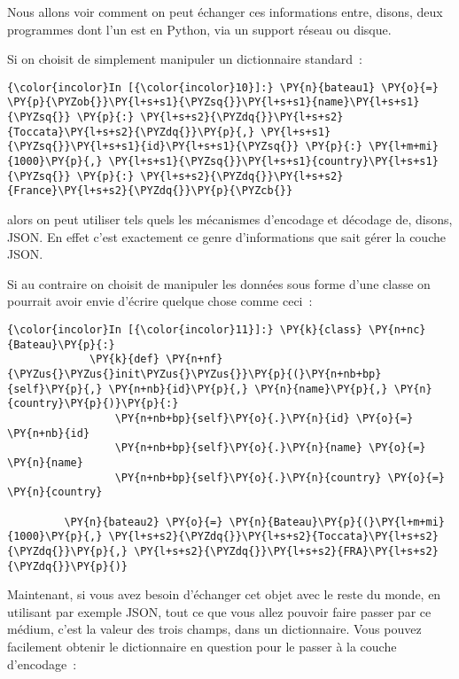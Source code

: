 Nous allons voir comment on peut échanger ces informations entre,
disons, deux programmes dont l'un est en Python, via un support réseau
ou disque.

    Si on choisit de simplement manipuler un dictionnaire standard~:

    \begin{Verbatim}[commandchars=\\\{\}]
{\color{incolor}In [{\color{incolor}10}]:} \PY{n}{bateau1} \PY{o}{=} \PY{p}{\PYZob{}}\PY{l+s+s1}{\PYZsq{}}\PY{l+s+s1}{name}\PY{l+s+s1}{\PYZsq{}} \PY{p}{:} \PY{l+s+s2}{\PYZdq{}}\PY{l+s+s2}{Toccata}\PY{l+s+s2}{\PYZdq{}}\PY{p}{,} \PY{l+s+s1}{\PYZsq{}}\PY{l+s+s1}{id}\PY{l+s+s1}{\PYZsq{}} \PY{p}{:} \PY{l+m+mi}{1000}\PY{p}{,} \PY{l+s+s1}{\PYZsq{}}\PY{l+s+s1}{country}\PY{l+s+s1}{\PYZsq{}} \PY{p}{:} \PY{l+s+s2}{\PYZdq{}}\PY{l+s+s2}{France}\PY{l+s+s2}{\PYZdq{}}\PY{p}{\PYZcb{}}
\end{Verbatim}


    alors on peut utiliser tels quels les mécanismes d'encodage et décodage
de, disons, JSON. En effet c'est exactement ce genre d'informations que
sait gérer la couche JSON.

    Si au contraire on choisit de manipuler les données sous forme d'une
classe on pourrait avoir envie d'écrire quelque chose comme ceci~:

    \begin{Verbatim}[commandchars=\\\{\}]
{\color{incolor}In [{\color{incolor}11}]:} \PY{k}{class} \PY{n+nc}{Bateau}\PY{p}{:}
             \PY{k}{def} \PY{n+nf}{\PYZus{}\PYZus{}init\PYZus{}\PYZus{}}\PY{p}{(}\PY{n+nb+bp}{self}\PY{p}{,} \PY{n+nb}{id}\PY{p}{,} \PY{n}{name}\PY{p}{,} \PY{n}{country}\PY{p}{)}\PY{p}{:}
                 \PY{n+nb+bp}{self}\PY{o}{.}\PY{n}{id} \PY{o}{=} \PY{n+nb}{id}
                 \PY{n+nb+bp}{self}\PY{o}{.}\PY{n}{name} \PY{o}{=} \PY{n}{name}
                 \PY{n+nb+bp}{self}\PY{o}{.}\PY{n}{country} \PY{o}{=} \PY{n}{country}
                 
         \PY{n}{bateau2} \PY{o}{=} \PY{n}{Bateau}\PY{p}{(}\PY{l+m+mi}{1000}\PY{p}{,} \PY{l+s+s2}{\PYZdq{}}\PY{l+s+s2}{Toccata}\PY{l+s+s2}{\PYZdq{}}\PY{p}{,} \PY{l+s+s2}{\PYZdq{}}\PY{l+s+s2}{FRA}\PY{l+s+s2}{\PYZdq{}}\PY{p}{)}
\end{Verbatim}


    Maintenant, si vous avez besoin d'échanger cet objet avec le reste du
monde, en utilisant par exemple JSON, tout ce que vous allez pouvoir
faire passer par ce médium, c'est la valeur des trois champs, dans un
dictionnaire. Vous pouvez facilement obtenir le dictionnaire en question
pour le passer à la couche d'encodage~:

